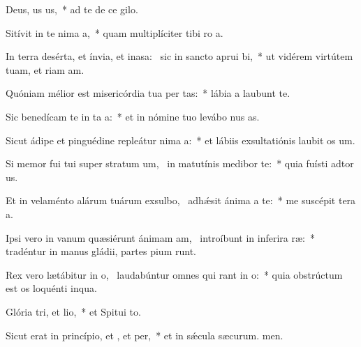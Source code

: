 \item Deus, us us,~* ad te de ce gilo.
\item Sitívit in te nima a,~* quam multiplíciter tibi ro a.
\item In terra desérta, et ínvia, et inasa:~\pscross{} sic in sancto aprui bi,~* ut vidérem virtútem tuam, et riam am.
\item Quóniam mélior est misericórdia tua per tas:~* lábia a laubunt te.
\item Sic benedícam te in ta a:~* et in nómine tuo levábo nus as.
\item Sicut ádipe et pinguédine repleátur nima a:~* et lábiis exsultatiónis laubit os um.
\item Si memor fui tui super stratum um,~\pscross{} in matutínis medibor  te:~* quia fuísti adtor us.
\item Et in velaménto alárum tuárum exsulbo,~\pscross{} adhǽsit ánima a  te:~* me suscépit tera a.
\item Ipsi vero in vanum quæsiérunt ánimam am,~\pscross{} introíbunt in inferira ræ:~* tradéntur in manus gládii, partes pium runt.
\item Rex vero lætábitur in o,~\pscross{} laudabúntur omnes qui rant in o:~* quia obstrúctum est os loquénti inqua.
\item Glória tri, et lio,~* et Spitui to.
\item Sicut erat in princípio, et , et per,~* et in sǽcula sæcurum. men.

